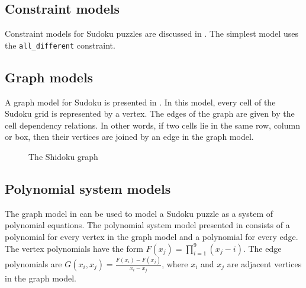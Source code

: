 \subsection{Constraint models}
\label{sec:models:constraints}

Constraint models for Sudoku puzzles are discussed in \cite{simonissudoku}. The simplest model uses the \verb!all_different! constraint.

\subsection{Graph models}
\label{sec:models:graph}

A graph model for Sudoku is presented in \cite{gagovargaset}. In this model, every cell of the Sudoku grid is represented by a vertex. The edges of the graph are given by the cell dependency relations. In other words, if two cells lie in the same row, column or box, then their vertices are joined by an edge in the graph model.

\begin{figure}[h]
\centering
\begin{dot2tex}[circo,mathmode,options={--graphstyle "scale=0.40"}]
  
\end{dot2tex}
\caption{The Shidoku graph}
\end{figure}

\subsection{Polynomial system models}
\label{sec:models:polynomials}

The graph model in \cite{gagovargaset} can be used to model a Sudoku puzzle as a system of polynomial equations. The polynomial system model presented in \cite{gagovargaset} consists of a polynomial for every vertex in the graph model and a polynomial for every edge. The vertex polynomials have the form $F(x_j) = \prod_{i=1}^{9} (x_j - i)$. The edge polynomials are $G(x_i, x_j) = \frac{F(x_i) - F(x_j)}{x_i - x_j}$, where $x_i$ and $x_j$ are adjacent vertices in the graph model. 

